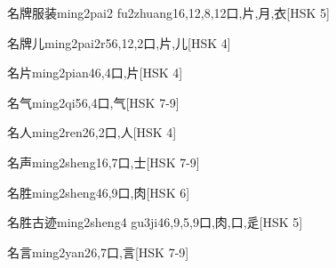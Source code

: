 \begin{EntryWithPhonetic}{名牌服装}{ming2pai2 fu2zhuang1}{6,12,8,12}{⼝,⽚,⽉,⾐}[HSK 5]
\end{EntryWithPhonetic}

\begin{EntryWithPhonetic}{名牌儿}{ming2pai2r5}{6,12,2}{⼝,⽚,⼉}[HSK 4]
\end{EntryWithPhonetic}

\begin{EntryWithPhonetic}{名片}{ming2pian4}{6,4}{⼝,⽚}[HSK 4]
\end{EntryWithPhonetic}

\begin{EntryWithPhonetic}{名气}{ming2qi5}{6,4}{⼝,⽓}[HSK 7-9]
\end{EntryWithPhonetic}

\begin{EntryWithPhonetic}{名人}{ming2ren2}{6,2}{⼝,⼈}[HSK 4]
\end{EntryWithPhonetic}

\begin{EntryWithPhonetic}{名声}{ming2sheng1}{6,7}{⼝,⼠}[HSK 7-9]
\end{EntryWithPhonetic}

\begin{EntryWithPhonetic}{名胜}{ming2sheng4}{6,9}{⼝,⾁}[HSK 6]
\end{EntryWithPhonetic}

\begin{EntryWithPhonetic}{名胜古迹}{ming2sheng4 gu3ji4}{6,9,5,9}{⼝,⾁,⼝,⾡}[HSK 5]
\end{EntryWithPhonetic}

\begin{EntryWithPhonetic}{名言}{ming2yan2}{6,7}{⼝,⾔}[HSK 7-9]
\end{EntryWithPhonetic}

